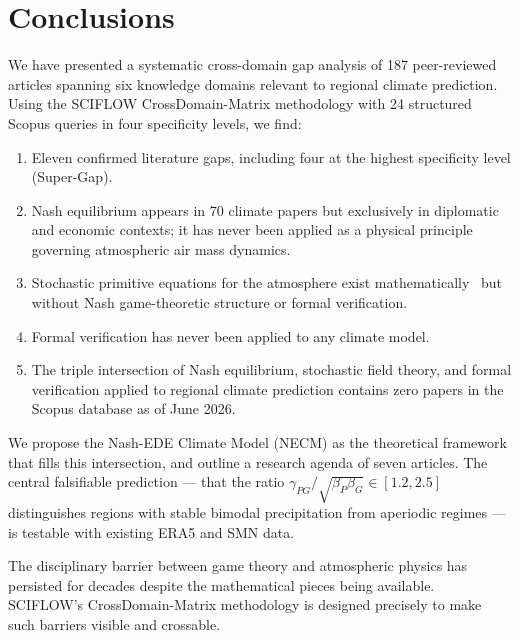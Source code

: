 \documentclass[12pt,a4paper]{article}
\begin{document}
\section{Conclusions}

We have presented a systematic cross-domain gap analysis of 187
peer-reviewed articles spanning six knowledge domains relevant to
regional climate prediction. Using the SCIFLOW CrossDomain-Matrix
methodology with 24 structured Scopus queries in four specificity
levels, we find:

\begin{enumerate}
\item Eleven confirmed literature gaps, including four at the
      highest specificity level (Super-Gap).
\item Nash equilibrium appears in 70 climate papers but exclusively
      in diplomatic and economic contexts; it has never been applied
      as a physical principle governing atmospheric air mass dynamics.
\item Stochastic primitive equations for the atmosphere exist
      mathematically~\citep{Debussche2012,Majda2006} but without
      Nash game-theoretic structure or formal verification.
\item Formal verification has never been applied to any climate model.
\item The triple intersection of Nash equilibrium, stochastic field
      theory, and formal verification applied to regional climate
      prediction contains zero papers in the Scopus database as of
      June 2026.
\end{enumerate}

We propose the Nash-EDE Climate Model (NECM) as the theoretical
framework that fills this intersection, and outline a research agenda
of seven articles. The central falsifiable prediction — that the
ratio $\gamma_{PG}/\sqrt{\beta_P\beta_G} \in [1.2, 2.5]$ distinguishes
regions with stable bimodal precipitation from aperiodic regimes —
is testable with existing ERA5 and SMN data.

The disciplinary barrier between game theory and atmospheric physics
has persisted for decades despite the mathematical pieces being
available. SCIFLOW's CrossDomain-Matrix methodology is designed
precisely to make such barriers visible and crossable.



\end{document}
